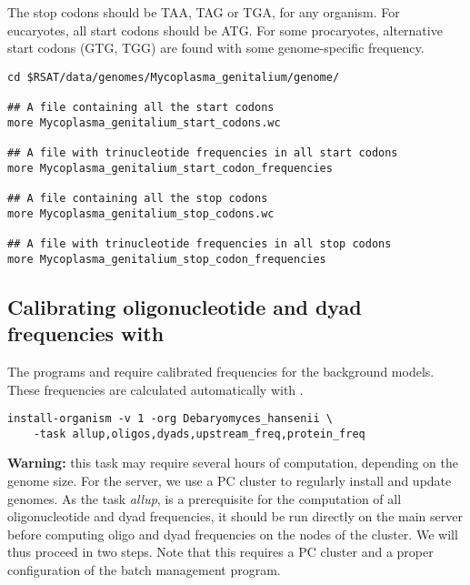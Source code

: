 The stop codons should be TAA, TAG or TGA, for any organism. For
eucaryotes, all start codons should be ATG. For some procaryotes,
alternative start codons (GTG, TGG) are found with some
genome-specific frequency.

\begin{footnotesize}
\begin{verbatim}
cd $RSAT/data/genomes/Mycoplasma_genitalium/genome/

## A file containing all the start codons
more Mycoplasma_genitalium_start_codons.wc

## A file with trinucleotide frequencies in all start codons
more Mycoplasma_genitalium_start_codon_frequencies

## A file containing all the stop codons
more Mycoplasma_genitalium_stop_codons.wc

## A file with trinucleotide frequencies in all stop codons
more Mycoplasma_genitalium_stop_codon_frequencies
\end{verbatim}
\end{footnotesize}

\subsection{Calibrating oligonucleotide and dyad frequencies with }

The programs  and 
require calibrated frequencies for the background models. These
frequencies are calculated automatically with
.

\begin{footnotesize}
\begin{verbatim}
install-organism -v 1 -org Debaryomyces_hansenii \
    -task allup,oligos,dyads,upstream_freq,protein_freq
\end{verbatim}
\end{footnotesize}

\textbf{Warning: } this task may require several hours of computation,
depending on the genome size. For the \RSAT server, we use a PC
cluster to regularly install and update genomes. As the task
\textit{allup}, is a prerequisite for the computation of all
oligonucleotide and dyad frequencies, it should be run directly on the
main server before computing oligo and dyad frequencies on the nodes
of the cluster. We will thus proceed in two steps. Note that this
requires a PC cluster and a proper configuration of the batch
management program.


